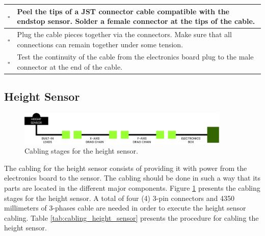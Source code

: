 \documentclass{article}
\begin{document}
\begin{singlespace}
\begin{xltabular}{\textwidth}{|c|X|}
    $\square$ & Peel the tips of a JST connector cable compatible with the endstop sensor. Solder a female connector at the tips of the cable. \\ \hline
    $\square$ & Plug the cable pieces together via the connectors. Make sure that all connections can remain together under some tension. \\ \hline
    $\square$ & Test the continuity of the cable from the electronics board plug to the male connector at the end of the cable. \\ \hline 
\end{xltabular}
\end{singlespace}

\subsection{Height Sensor}
\begin{figure}[H]
    \centering
    \includegraphics[width=0.9\textwidth]{images/cabling/height_sensors_cabling.pdf}
    \caption{Cabling stages for the height sensor.}
    \label{fig:cabling_height_sensors}
\end{figure}
The cabling for the height sensor consists of providing it with power from the electronics board to the sensor. The cabling should be done in such a way that its parts are located in the different major components. Figure \ref{fig:cabling_height_sensors} presents the cabling stages for the height sensor. A total of four (4) 3-pin connectors and 4350 millimeters of 3-phases cable are needed in order to execute the height sensor cabling. Table \ref{tab:cabling_height_sensor} presents the procedure for cabling the height sensor.
\end{document}
